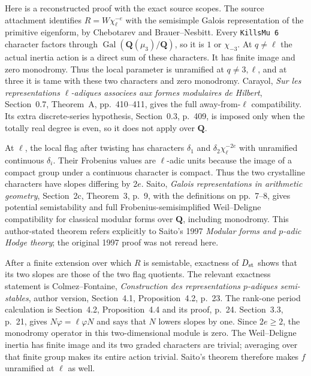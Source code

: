 Here is a reconstructed proof with the exact source scopes.
The source attachment identifies $R=W\chi_\ell^{-e}$ with
the semisimple Galois representation of the primitive eigenform,
by Chebotarev and Brauer--Nesbitt.
Every \texttt{KillsMu 6} character factors through
$\operatorname{Gal}(\mathbf Q(\mu_3)/\mathbf Q)$, so it is
$1$ or $\chi_{-3}$.
At $q\ne\ell$ the actual inertia action is a direct sum of these
characters. It has finite image and zero monodromy.
Thus the local parameter is unramified at $q\ne3,\ell$, and at
three it is tame with these two characters and zero monodromy.
Carayol, \emph{Sur les representations $\ell$-adiques associees
aux formes modulaires de Hilbert}, Section~0.7, Theorem~A,
pp.~410--411, gives the full away-from-$\ell$ compatibility.
Its extra discrete-series hypothesis, Section~0.3, p.~409,
is imposed only when the totally real degree is even, so it
does not apply over $\mathbf Q$.

At $\ell$, the local flag after twisting has characters
$\delta_1$ and $\delta_2\chi_\ell^{-2e}$ with unramified
continuous $\delta_i$.
Their Frobenius values are $\ell$-adic units because the image
of a compact group under a continuous character is compact.
Thus the two crystalline characters have slopes differing by $2e$.
Saito, \emph{Galois representations in arithmetic geometry},
Section~2c, Theorem~3, p.~9, with the definitions on pp.~7--8,
gives potential semistability and full Frobenius-semisimplified
Weil--Deligne compatibility for classical modular forms over
$\mathbf Q$, including monodromy. This author-stated theorem
refers explicitly to Saito's 1997 \emph{Modular forms and $p$-adic
Hodge theory}; the original 1997 proof was not reread here.

After a finite extension over which $R$ is semistable, exactness
of $D_{\rm st}$ shows that its two slopes are those of the two
flag quotients. The relevant exactness statement is
Colmez--Fontaine, \emph{Construction des representations $p$-adiques
semi-stables}, author version, Section~4.1, Proposition~4.2,
p.~23. The rank-one period calculation is Section~4.2,
Proposition~4.4 and its proof, p.~24.
Section~3.3, p.~21, gives $N\varphi=\ell\varphi N$ and says
that $N$ lowers slopes by one. Since $2e\geq2$, the monodromy
operator in this two-dimensional module is zero.
The Weil--Deligne inertia has finite image and its two graded
characters are trivial; averaging over that finite group makes
its entire action trivial. Saito's theorem therefore makes $f$
unramified at $\ell$ as well.

